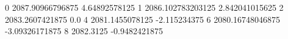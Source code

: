 0 2087.90966796875 4.64892578125
1 2086.102783203125 2.842041015625
2 2083.2607421875 0.0
4 2081.1455078125 -2.115234375
6 2080.16748046875 -3.09326171875
8 2082.3125 -0.9482421875
